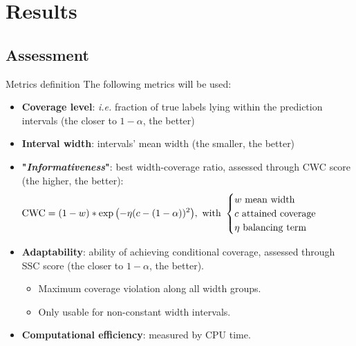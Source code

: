 \documentclass{beamer}
\renewcommand{\a}{\alpha}
\begin{document}

\section{Results}


\subsection{Assessment}

\begin{frame}{Metrics definition}
The following metrics will be used:
\begin{itemize}%
    \item \textbf{Coverage level}: \textit{i.e.} fraction of true labels lying within the prediction intervals (the closer to $1-\a$, the better)
    \item \textbf{Interval width}: intervals' mean width (the smaller, the better)
    \item \textbf{"\textit{Informativeness}"}: best width-coverage ratio, assessed through CWC score (the higher, the better):
    \vspace{-3mm}
        $$ \hspace{-10mm} \mathrm{CWC} = (1 - w) * \exp{\left(-\eta (c - (1-\alpha))^2\right)},\ \mathrm{with}\ 
        \begin{cases}
            w\ \mathrm{mean}\ \mathrm{width}\\
            c\ \mathrm{attained}\ \mathrm{coverage}\\
            \eta\ \mathrm{balancing}\ \mathrm{term}
        \end{cases}$$ 
    \vspace{-2mm}
    \item \textbf{Adaptability}: ability of achieving conditional coverage, assessed through SSC score (the closer to $1-\a$, the better).
    \begin{itemize}%
        \item Maximum coverage violation along all width groups.
        \item Only usable for non-constant width intervals.
    \end{itemize}
    \item \textbf{Computational efficiency}: measured by CPU time.

\end{itemize}
\end{frame}
\end{document}
